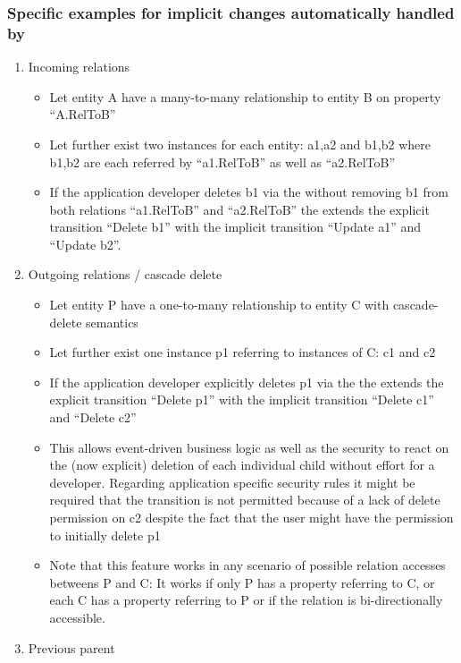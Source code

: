 \subsubsection{Specific examples for implicit changes automatically handled by \AMBETH{}}
\begin{enumerate}
	\item Incoming relations
		\begin{itemize}
			\item Let entity A have a many-to-many relationship to entity B on property ``A.RelToB''
			\item Let further exist two instances for each entity: a1,a2 and b1,b2 where b1,b2 are each referred by ``a1.RelToB'' as well as ``a2.RelToB''
			\item If the application developer deletes b1 via the \AMBETH{}  without removing b1 from both relations ``a1.RelToB'' and ``a2.RelToB'' the  extends the explicit transition ``Delete b1'' with the implicit transition ``Update a1'' and ``Update b2''.
		\end{itemize}
	\item Outgoing relations / cascade delete
		\begin{itemize}
			\item	Let entity P have a one-to-many relationship to entity C with cascade-delete semantics
			\item Let further exist one instance p1 referring to instances of C: c1 and c2
			\item If the application developer explicitly deletes p1 via the \AMBETH{}  the  extends the explicit transition ``Delete p1'' with the implicit transition ``Delete c1'' and ``Delete c2''
			\item This allows event-driven business logic as well as the \AMBETH{} security to react on the (now explicit) deletion of each individual child without  effort for a developer. Regarding application specific security rules it might be required that the transition is not permitted because of a lack of delete permission on c2 despite the fact that the user might have the permission to initially delete p1
			\item Note that this feature works in any scenario of possible relation accesses betweens P and C: It works if only P has a property referring to C, or each C has a property referring to P or if the relation is bi-directionally accessible.
		\end{itemize}
	\item Previous parent

\end{enumerate}
